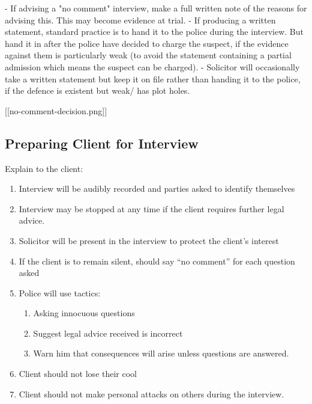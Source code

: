 \documentclass[
]{article}
\newenvironment{Shaded}{}{}
\newcommand{\NormalTok}[1]{#1}
\providecommand{\tightlist}{%
  \setlength{\itemsep}{0pt}\setlength{\parskip}{0pt}}
\begin{document}
\begin{Shaded}
\begin{Highlighting}[]
\NormalTok{{-} If advising a "no comment" interview, make a full written note of the reasons for advising this. This may become evidence at trial. }
\NormalTok{{-} If producing a written statement, standard practice is to hand it to the police during the interview. But hand it in after the police have decided to charge the suspect, if the evidence against them is particularly weak (to avoid the statement containing a partial admission which means the suspect can be charged). }
\NormalTok{{-} Solicitor will occasionally take a written statement but keep it on file rather than handing it to the police, if the defence is existent but weak/ has plot holes. }
\end{Highlighting}
\end{Shaded}

{[}{[}no-comment-decision.png{]}{]}

\hypertarget{preparing-client-for-interview}{%
\subsection{Preparing Client for
Interview}\label{preparing-client-for-interview}}

Explain to the client:

\begin{enumerate}
\def\labelenumi{\arabic{enumi}.}
\tightlist
\item
  Interview will be audibly recorded and parties asked to identify
  themselves
\item
  Interview may be stopped at any time if the client requires further
  legal advice.
\item
  Solicitor will be present in the interview to protect the client's
  interest
\item
  If the client is to remain silent, should say ``no comment'' for each
  question asked
\item
  Police will use tactics:

  \begin{enumerate}
  \def\labelenumii{\arabic{enumii}.}
  \tightlist
  \item
    Asking innocuous questions
  \item
    Suggest legal advice received is incorrect
  \item
    Warn him that consequences will arise unless questions are answered.
  \end{enumerate}
\item
  Client should not lose their cool
\item
  Client should not make personal attacks on others during the
  interview.
\end{enumerate}
\end{document}
